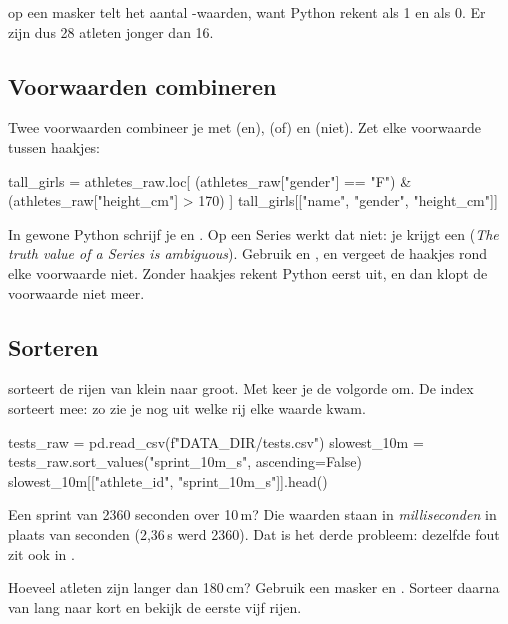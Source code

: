 \documentclass[11pt,a4paper]{article}
\begin{document}
 op een masker telt het aantal -waarden, want
Python rekent  als 1 en  als 0. Er zijn dus 28
atleten jonger dan 16.

\subsection{Voorwaarden combineren}

Twee voorwaarden combineer je met \code{\&} (en), \code{|} (of) en
\code{\textasciitilde} (niet). Zet elke voorwaarde tussen haakjes:

\begin{python}
tall_girls = athletes_raw.loc[
    (athletes_raw["gender"] == "F") & (athletes_raw["height_cm"] > 170)
]
tall_girls[["name", "gender", "height_cm"]]
\end{python}

\begin{opgelet}
In gewone Python schrijf je  en . Op een Series werkt
dat niet: je krijgt een  (\emph{The truth value of a
Series is ambiguous}). Gebruik \code{\&} en \code{|}, en vergeet de
haakjes rond elke voorwaarde niet. Zonder haakjes rekent Python eerst
\code{\&} uit, en dan klopt de voorwaarde niet meer.
\end{opgelet}

\subsection{Sorteren}

 sorteert de rijen van klein naar groot. Met
 keer je de volgorde om. De index sorteert mee: zo
zie je nog uit welke rij elke waarde kwam.

\begin{python}
tests_raw = pd.read_csv(f"{DATA_DIR}/tests.csv")
slowest_10m = tests_raw.sort_values("sprint_10m_s", ascending=False)
slowest_10m[["athlete_id", "sprint_10m_s"]].head()
\end{python}

Een sprint van 2360 seconden over 10\,m? Die waarden staan in
\emph{milliseconden} in plaats van seconden (2,36\,s werd 2360). Dat is
het derde probleem: dezelfde fout zit ook in .

\begin{probeer}
Hoeveel atleten zijn langer dan 180\,cm? Gebruik een masker en
. Sorteer daarna  van lang naar kort en
bekijk de eerste vijf rijen.
\end{probeer}
\end{document}
